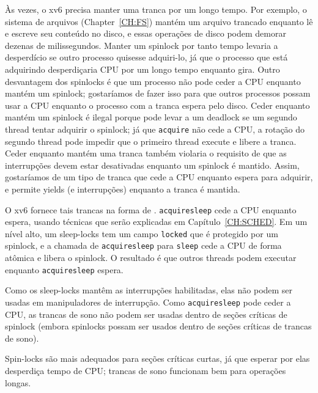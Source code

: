 Às vezes, o xv6 precisa manter uma tranca por um longo tempo. Por exemplo, o
sistema de arquivos (Chapter~\ref{CH:FS}) mantém um arquivo trancado enquanto lê
e escreve seu conteúdo no disco, e essas operações de disco podem
demorar dezenas de milissegundos. Manter um spinlock por tanto tempo levaria a
desperdício se outro processo quisesse adquiri-lo, já que o processo que está adquirindo
desperdiçaria CPU por um longo tempo enquanto gira. Outro
desvantagem dos spinlocks é que um processo não pode ceder a CPU enquanto
mantém um spinlock; gostaríamos de fazer isso para que outros processos possam
usar a CPU enquanto o processo com a tranca espera pelo disco.
Ceder enquanto mantém um spinlock é ilegal porque pode
levar a um deadlock se um segundo thread tentar adquirir o spinlock;
já que {\tt acquire} não cede a CPU, a rotação do segundo thread pode
impedir que o primeiro thread execute e libere a tranca.
Ceder enquanto mantém uma tranca também violaria
o requisito de que as interrupções devem estar desativadas enquanto um spinlock é mantido.
Assim, gostaríamos de um tipo de tranca que cede a CPU enquanto espera para
adquirir, e permite yields (e interrupções) enquanto a tranca é mantida.

O xv6 fornece tais trancas na forma de
.
\lstinline{acquiresleep}
cede a CPU enquanto espera,
usando técnicas que serão explicadas em
Capítulo~\ref{CH:SCHED}.
Em um nível alto, um sleep-locks tem um
campo \lstinline{locked}
que é protegido por um spinlock, e 
a chamada de \lstinline{acquiresleep}
para
\lstinline{sleep}
cede a CPU de forma atômica e libera o spinlock.
O resultado é que outros threads podem executar enquanto
\lstinline{acquiresleep}
espera.

Como os sleep-locks mantêm as interrupções habilitadas, elas não podem ser
usadas em manipuladores de interrupção.
Como
\lstinline{acquiresleep}
pode ceder a CPU,
as trancas de sono não podem ser usadas dentro de seções críticas de spinlock
(embora spinlocks possam ser usados dentro de seções críticas de trancas de sono).

Spin-locks são mais adequados para seções críticas curtas,
já que esperar por elas desperdiça tempo de CPU;
trancas de sono funcionam bem para operações longas.

